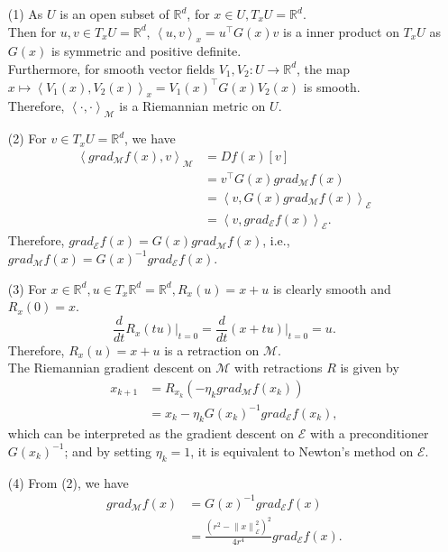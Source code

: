 \documentclass[en, oneside]{assignment}
\begin{document}
\begin{sol}
    \begin{itemize}
        \item[(1)] As $U$ is an open subset of $\mathbb{R}^d$, for $x \in U, T_x U = \mathbb{R}^d$.\\
        Then for $u, v \in T_x U = \mathbb{R}^d$, 
        $\left\langle u, v \right\rangle _x = u^{\top} G(x) v$ is a inner product on $T_x U$ as $G(x)$ is symmetric and positive definite.\\
        Furthermore, for smooth vector fields $V_1, V_2: U \rightarrow \mathbb{R}^d$, 
        the map $x \mapsto \left\langle V_1(x), V_2(x) \right\rangle _x = V_1(x)^{\top} G(x) V_2(x)$ is smooth.\\
        Therefore, $\left\langle \cdot, \cdot \right\rangle _\mathcal{M}$ is a Riemannian metric on $U$.
        \item[(2)] For $v \in T_x U = \mathbb{R}^d$, we have
        \begin{align*}
            \left\langle grad _\mathcal{M} f(x), v \right\rangle _\mathcal{M}  & = Df(x)[v]\\
            & = v^{\top} G(x) grad _\mathcal{M} f(x)\\
            & = \left\langle v, G(x) grad _\mathcal{M} f(x) \right\rangle _\mathcal{E}\\
            & = \left\langle v, grad _\mathcal{E} f(x) \right\rangle _\mathcal{E}.
        \end{align*}
        Therefore, $grad _\mathcal{E} f(x) = G(x) grad _\mathcal{M} f(x)$, i.e., $grad _\mathcal{M} f(x) = G(x)^{-1} grad _\mathcal{E} f(x)$.
        \item[(3)] For $x \in \mathbb{R}^d, u \in T_x \mathbb{R}^d = \mathbb{R}^d, R_x(u) = x + u$ is clearly smooth and $R_x(0) = x$.
        \begin{equation*}
            \frac{d}{dt} R_x(tu) \bigg|_{t=0} = \frac{d}{dt} (x + tu) \bigg|_{t=0} = u.
        \end{equation*}
        Therefore, $R_x(u) = x + u$ is a retraction on $\mathcal{M}$.\\
        The Riemannian gradient descent on $\mathcal{M}$ with retractions $R$ is given by
        \begin{align*}
            x_{k+1} & = R_{x_k}(-\eta_k grad _\mathcal{M} f(x_k))\\
            & = x_k - \eta_k G(x_k)^{-1} grad _\mathcal{E} f(x_k),
        \end{align*}
        which can be interpreted as the gradient descent on $\mathcal{E}$ with a preconditioner $G(x_k)^{-1}$; 
        and by setting $\eta_k = 1$, it is equivalent to Newton's method on $\mathcal{E}$.
        \item[(4)] From (2), we have
        \begin{align*}
            grad _\mathcal{M} f(x) & = G(x)^{-1} grad _\mathcal{E} f(x)\\
            & = \frac{(r^2 - \left\lVert x \right\rVert _\mathcal{E} ^2)^2}{4r^4} grad _\mathcal{E} f(x).
        \end{align*}
    \end{itemize}
\end{sol}
\end{document}
